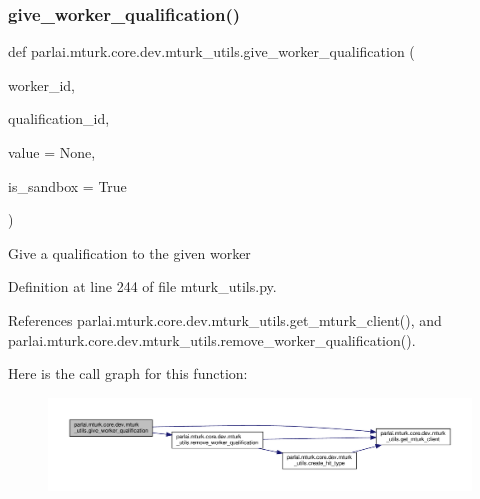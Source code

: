 \subsubsection{\texorpdfstring{give\+\_\+worker\+\_\+qualification()}{give\_worker\_qualification()}}
{\footnotesize\ttfamily def parlai.\+mturk.\+core.\+dev.\+mturk\+\_\+utils.\+give\+\_\+worker\+\_\+qualification (\begin{DoxyParamCaption}\item[{}]{worker\+\_\+id,  }\item[{}]{qualification\+\_\+id,  }\item[{}]{value = {\ttfamily None},  }\item[{}]{is\+\_\+sandbox = {\ttfamily True} }\end{DoxyParamCaption})}

\begin{DoxyVerb}Give a qualification to the given worker\end{DoxyVerb}
 

Definition at line 244 of file mturk\+\_\+utils.\+py.



References parlai.\+mturk.\+core.\+dev.\+mturk\+\_\+utils.\+get\+\_\+mturk\+\_\+client(), and parlai.\+mturk.\+core.\+dev.\+mturk\+\_\+utils.\+remove\+\_\+worker\+\_\+qualification().

Here is the call graph for this function\+:
\nopagebreak
\begin{figure}[H]
\begin{center}
\leavevmode
\includegraphics[width=350pt]{namespaceparlai_1_1mturk_1_1core_1_1dev_1_1mturk__utils_a631fbce36ff4d09422f29513460bc744_cgraph}
\end{center}
\end{figure}
\mbox{\label{namespaceparlai_1_1mturk_1_1core_1_1dev_1_1mturk__utils_abc2c057b91641179f7c4bb50dd916488}} 
